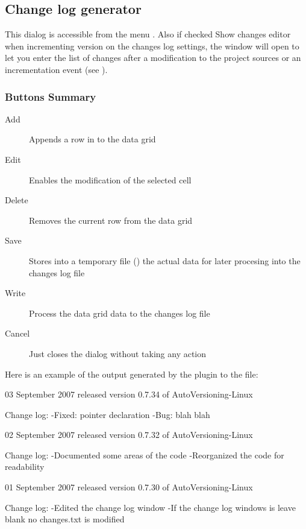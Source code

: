 \subsection{Change log generator}

This dialog is accessible from the menu . Also if checked Show changes editor when incrementing version on the changes log settings, the window will open to let you enter the list of changes after a modification to the project sources or an incrementation event (see ).


\subsubsection{Buttons Summary}

\begin{description}
\item[Add] Appends a row in to the data grid
\item[Edit] Enables the modification of the selected cell
\item[Delete] Removes the current row from the data grid
\item[Save] Stores into a temporary file () the actual data for later procesing into the changes log file
\item[Write] Process the data grid data to the changes log file
\item[Cancel] Just closes the dialog without taking any action
\end{description}

Here is an example of the output generated by the plugin to the  file:

\begin{code}
03 September 2007
   released version 0.7.34 of AutoVersioning-Linux

     Change log:
        -Fixed: pointer declaration
        -Bug: blah blah

02 September 2007
   released version 0.7.32 of AutoVersioning-Linux

     Change log:
        -Documented some areas of the code
        -Reorganized the code for readability

01 September 2007
   released version 0.7.30 of AutoVersioning-Linux

     Change log:
        -Edited the change log window
        -If the change log windows is leave blank no changes.txt is modified
\end{code}
